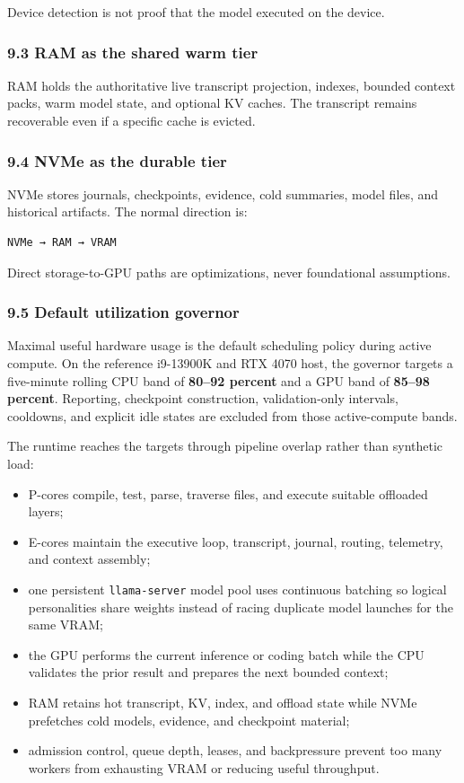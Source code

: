 Device detection is not proof that the model executed on the device.

\subsubsection{9.3 RAM as the shared warm tier}

RAM holds the authoritative live transcript projection, indexes, bounded
context packs, warm model state, and optional KV caches. The transcript remains
recoverable even if a specific cache is evicted.

\subsubsection{9.4 NVMe as the durable tier}

NVMe stores journals, checkpoints, evidence, cold summaries, model files, and
historical artifacts. The normal direction is:

\begin{verbatim}
NVMe → RAM → VRAM
\end{verbatim}

Direct storage-to-GPU paths are optimizations, never foundational assumptions.

\subsubsection{9.5 Default utilization governor}

Maximal useful hardware usage is the default scheduling policy during active
compute. On the reference i9-13900K and RTX 4070 host, the governor targets a
five-minute rolling CPU band of \textbf{80--92 percent} and a GPU band of \textbf{85--98
percent}. Reporting, checkpoint construction, validation-only intervals,
cooldowns, and explicit idle states are excluded from those active-compute
bands.

The runtime reaches the targets through pipeline overlap rather than synthetic
load:

\begin{itemize}
\item
  P-cores compile, test, parse, traverse files, and execute suitable offloaded
  layers;
\item
  E-cores maintain the executive loop, transcript, journal, routing, telemetry,
  and context assembly;
\item
  one persistent \texttt{llama-server} model pool uses continuous batching so logical
  personalities share weights instead of racing duplicate model launches for
  the same VRAM;
\item
  the GPU performs the current inference or coding batch while the CPU validates
  the prior result and prepares the next bounded context;
\item
  RAM retains hot transcript, KV, index, and offload state while NVMe prefetches
  cold models, evidence, and checkpoint material;
\item
  admission control, queue depth, leases, and backpressure prevent too many
  workers from exhausting VRAM or reducing useful throughput.
\end{itemize}

